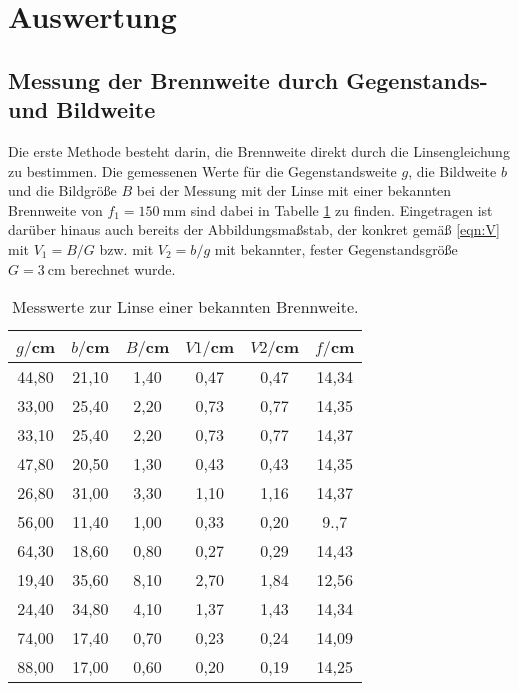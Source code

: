 \section{Auswertung}
\label{sec:Auswertung}

\subsection{Messung der Brennweite durch Gegenstands- und Bildweite}
Die erste Methode besteht darin, die Brennweite direkt durch die Linsengleichung
zu bestimmen. Die gemessenen Werte für die Gegenstandsweite $g$, die Bildweite
$b$ und die Bildgröße $B$  bei der Messung mit der Linse mit einer bekannten
Brennweite von $f_1 = \SI{150}{\milli\meter}$ sind dabei in Tabelle
\ref{tab:bekannt} zu finden. Eingetragen ist darüber hinaus auch bereits der
Abbildungsmaßstab, der konkret gemäß \eqref{eqn:V} mit $V_1=B/G$ bzw. mit $V_2=b/g$
mit bekannter, fester Gegenstandsgröße $G = \SI{3}{\centi\meter}$ berechnet wurde.

\begin{table}[htp]
	\begin{center}
    \caption{Messwerte zur Linse einer bekannten Brennweite.}
    \label{tab:bekannt}
		\begin{tabular}{cccccc}
		\toprule
			{$g/$cm} & {$b/$cm} & {$B/$cm} & {$V1/$cm} & {$V2/$cm} & {$f/$cm}\\
			\midrule
			44,80 & 21,10 & 1,40 & 0,47 & 0,47 & 14,34\\
			33,00 & 25,40 & 2,20 & 0,73 & 0,77 & 14,35\\
			33,10 & 25,40 & 2,20 & 0,73 & 0,77 & 14,37\\
			47,80 & 20,50 & 1,30 & 0,43 & 0,43 & 14,35\\
			26,80 & 31,00 & 3,30 & 1,10 & 1,16 & 14,37\\
			56,00 & 11,40 & 1,00 & 0,33 & 0,20 & 9.,7\\
			64,30 & 18,60 & 0,80 & 0,27 & 0,29 & 14,43\\
			19,40 & 35,60 & 8,10 & 2,70 & 1,84 & 12,56\\
			24,40 & 34,80 & 4,10 & 1,37 & 1,43 & 14,34\\
			74,00 & 17,40 & 0,70 & 0,23 & 0,24 & 14,09\\
			88,00 & 17,00 & 0,60 & 0,20 & 0,19 & 14,25\\
		\bottomrule
		\end{tabular}
	\end{center}
\end{table}


